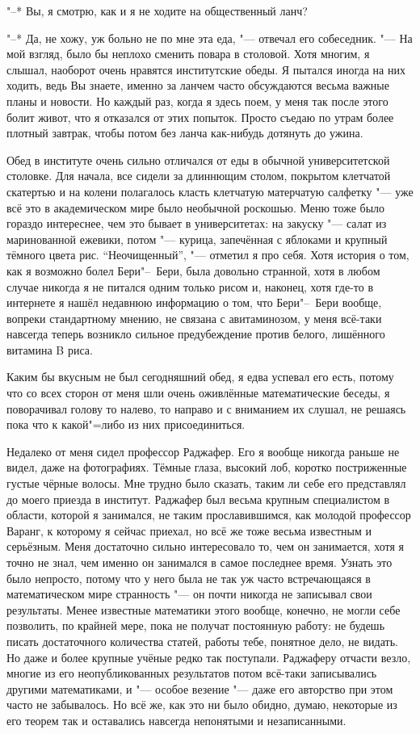 "--* Вы, я смотрю, как и я не ходите на общественный ланч?

"--* Да, не хожу, уж больно не по мне эта еда, "--- отвечал его собеседник.
"--- На мой взгляд, было бы неплохо сменить повара в столовой.
Хотя многим, я слышал, наоборот очень нравятся институтские обеды.
Я пытался иногда на них ходить, ведь Вы знаете, именно за ланчем часто
обсуждаются весьма важные планы и новости.
Но каждый раз, когда я здесь поем, у меня так после этого болит живот, что я
отказался от этих попыток.
Просто съедаю по утрам более плотный завтрак, чтобы потом без ланча как-нибудь
дотянуть до ужина.

Обед в институте очень сильно отличался от еды в обычной университетской
столовке.
Для начала, все сидели за длиннющим столом, покрытом клетчатой скатертью и на
колени полагалось класть клетчатую матерчатую салфетку "--- уже всё это в
академическом мире было необычной роскошью.
Меню тоже было гораздо интереснее, чем это бывает в университетах:
на закуску "--- салат из маринованной ежевики, потом "--- курица, запечённая с
яблоками и крупный тёмного цвета рис.
\enquote{Неочищенный}, "--- отметил я про себя.
Хотя история о том, как я возможно болел Бери"--~Бери, была довольно странной, хотя
в любом случае никогда я не питался одним только рисом и, наконец, хотя где-то
в интернете я нашёл недавнюю информацию о том, что Бери"--~Бери вообще, вопреки
стандартному мнению, не связана с авитаминозом, у меня всё-таки навсегда теперь
возникло сильное предубеждение против белого, лишённого витамина B риса.

Каким бы вкусным не был сегодняшний обед, я едва успевал его есть, потому что со
всех сторон от меня шли очень оживлённые математические беседы, я поворачивал
голову то налево, то направо и с вниманием их слушал, не решаясь пока что к
какой"=либо из них присоединиться.

Недалеко от меня сидел профессор Раджафер.
Его я вообще никогда раньше не видел, даже на фотографиях.
Тёмные глаза, высокий лоб, коротко постриженные густые чёрные волосы.
Мне трудно было сказать, таким ли себе его представлял до моего приезда в
институт.
Раджафер был весьма крупным специалистом в области, которой я занимался, не
таким прославившимся, как молодой профессор Варанг, к которому я сейчас приехал,
но всё же тоже весьма известным и серьёзным.
Меня достаточно сильно интересовало то, чем он занимается, хотя я точно не знал,
чем именно он занимался в самое последнее время.
Узнать это было непросто, потому что у него была не так уж часто встречающаяся в
математическом мире странность "--- он почти никогда не записывал свои
результаты.
Менее известные математики этого вообще, конечно, не могли себе позволить, по
крайней мере, пока не получат постоянную работу:
не будешь писать достаточного количества статей, работы тебе, понятное дело, не
видать.
Но даже и более крупные учёные редко так поступали.
Раджаферу отчасти везло, многие из его неопубликованных результатов потом
всё-таки записывались другими математиками, и "--- особое везение "--- даже
его авторство при этом часто не забывалось.
Но всё же, как это ни было обидно, думаю, некоторые из его теорем так и
оставались навсегда непонятыми и незаписанными.

